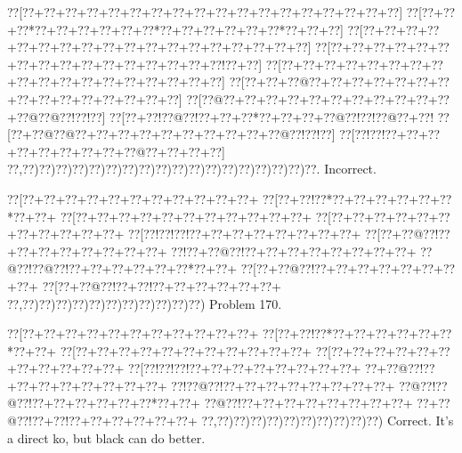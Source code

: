 \documentclass[a5paper]{article}
\begin{document}
\begin{center}
{\goo
\0??[\0??+\0??+\0??+\0??+\0??+\0??+\0??+\0??+\0??+\0??+\0??+\0??+\0??+\0??+\0??+\0??+\0??+\0??]
\0??[\0??+\0??+\0??*\0??+\0??+\0??+\0??+\0??+\0??*\0??+\0??+\0??+\0??+\0??+\0??*\0??+\0??+\0??]
\0??[\0??+\0??+\0??+\0??+\0??+\0??+\0??+\0??+\0??+\0??+\0??+\0??+\0??+\0??+\0??+\0??+\0??+\0??]
\0??[\0??+\0??+\0??+\0??+\0??+\0??+\0??+\0??+\0??+\0??+\0??+\0??+\0??+\0??+\0??+\0??!\0??+\0??]
\0??[\0??+\0??+\0??+\0??+\0??+\0??+\0??+\0??+\0??+\0??+\0??+\0??+\0??+\0??+\0??+\0??+\0??+\0??]
\0??[\0??+\0??+\0??@\0??+\0??+\0??+\0??+\0??+\0??+\0??+\0??+\0??+\0??+\0??+\0??+\0??+\0??+\0??]
\0??[\0??@\0??+\0??+\0??+\0??+\0??+\0??+\0??+\0??+\0??+\0??+\0??+\0??@\0??@\0??!\0??!\0??]
\0??[\0??+\0??!\0??@\0??!\0??+\0??+\0??*\0??+\0??+\0??+\0??@\0??!\0??!\0??@\0??+\0??!
\0??[\0??+\0??@\0??@\0??+\0??+\0??+\0??+\0??+\0??+\0??+\0??+\0??+\0??@\0??!\0??!\0??]
\0??[\0??!\0??!\0??+\0??+\0??+\0??+\0??+\0??+\0??+\0??+\0??@\0??+\0??+\0??+\0??]
\0??,\0??)\0??)\0??)\0??)\0??)\0??)\0??)\0??)\0??)\0??)\0??)\0??)\0??)\0??)\0??)\0??)\0??)\0??.
}
Incorrect. 

\end{center}
\newpage
\begin{center}
{\goo
\0??[\0??+\0??+\0??+\0??+\0??+\0??+\0??+\0??+\0??+\0??+\0??+
\0??[\0??+\0??!\0??*\0??+\0??+\0??+\0??+\0??+\0??*\0??+\0??+
\0??[\0??+\0??+\0??+\0??+\0??+\0??+\0??+\0??+\0??+\0??+\0??+
\0??[\0??+\0??+\0??+\0??+\0??+\0??+\0??+\0??+\0??+\0??+\0??+
\0??[\0??!\0??!\0??!\0??+\0??+\0??+\0??+\0??+\0??+\0??+\0??+
\0??[\0??+\0??@\0??!\0??+\0??+\0??+\0??+\0??+\0??+\0??+\0??+
\0??!\0??+\0??@\0??!\0??+\0??+\0??+\0??+\0??+\0??+\0??+\0??+
\0??@\0??!\0??@\0??!\0??+\0??+\0??+\0??+\0??+\0??*\0??+\0??+
\0??[\0??+\0??@\0??!\0??+\0??+\0??+\0??+\0??+\0??+\0??+\0??+
\0??[\0??+\0??@\0??!\0??+\0??!\0??+\0??+\0??+\0??+\0??+\0??+
\0??,\0??)\0??)\0??)\0??)\0??)\0??)\0??)\0??)\0??)\0??)\0??)
}
Problem 170.

\end{center}
\begin{center}
{\goo
\0??[\0??+\0??+\0??+\0??+\0??+\0??+\0??+\0??+\0??+\0??+\0??+
\0??[\0??+\0??!\0??*\0??+\0??+\0??+\0??+\0??+\0??*\0??+\0??+
\0??[\0??+\0??+\0??+\0??+\0??+\0??+\0??+\0??+\0??+\0??+\0??+
\0??[\0??+\0??+\0??+\0??+\0??+\0??+\0??+\0??+\0??+\0??+\0??+
\0??[\0??!\0??!\0??!\0??+\0??+\0??+\0??+\0??+\0??+\0??+\0??+
\0??+\0??@\0??!\0??+\0??+\0??+\0??+\0??+\0??+\0??+\0??+
\0??!\0??@\0??!\0??+\0??+\0??+\0??+\0??+\0??+\0??+\0??+
\0??@\0??!\0??@\0??!\0??+\0??+\0??+\0??+\0??+\0??*\0??+\0??+
\0??@\0??!\0??+\0??+\0??+\0??+\0??+\0??+\0??+\0??+
\0??+\0??@\0??!\0??+\0??!\0??+\0??+\0??+\0??+\0??+\0??+
\0??,\0??)\0??)\0??)\0??)\0??)\0??)\0??)\0??)\0??)\0??)
}
Correct. It's a direct ko, but black can do better. 

\end{center}
\end{document}
